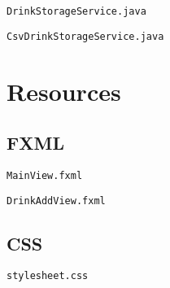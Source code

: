 \verb|DrinkStorageService.java|



\verb|CsvDrinkStorageService.java|



\section{Resources}

\subsection{FXML}

\verb|MainView.fxml|



\verb|DrinkAddView.fxml|



\subsection{CSS}

\verb|stylesheet.css|

